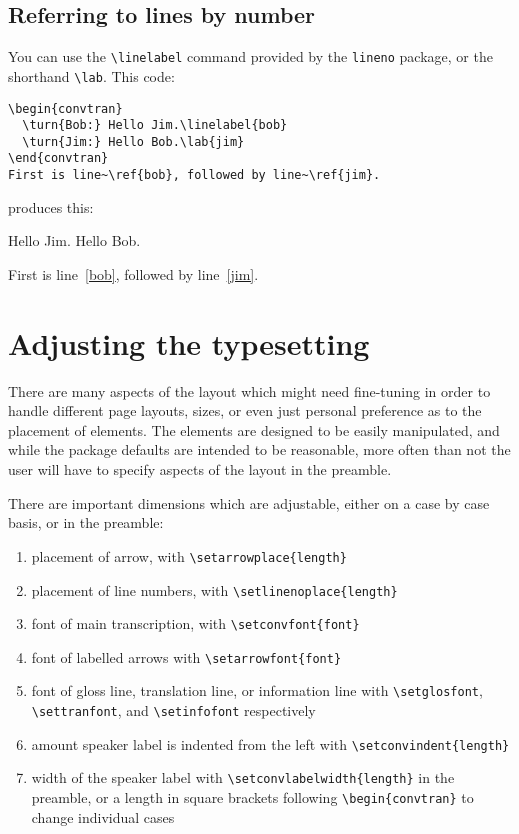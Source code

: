 \documentclass[a4paper]{article}
\begin{document}
\subsection{Referring to lines by number}

You can use the \verb!\linelabel! command provided by the \verb!lineno! package, or the shorthand \verb!\lab!. This code:
\begin{verbatim}
\begin{convtran}
  \turn{Bob:} Hello Jim.\linelabel{bob}
  \turn{Jim:} Hello Bob.\lab{jim}
\end{convtran}
First is line~\ref{bob}, followed by line~\ref{jim}.
\end{verbatim}
produces this:
\begin{convtran}
   Hello Jim.
   Hello Bob.
\end{convtran}
First is line~\ref{bob}, followed by line~\ref{jim}.

\section{Adjusting the typesetting}

There are many aspects of the layout which might need fine-tuning in
order to handle different page layouts, sizes, or even just personal
preference as to the placement of elements.  The elements are designed
to be easily manipulated, and while the package defaults are intended
to be reasonable, more often than not the user will have to specify
aspects of the layout in the preamble.

There are important dimensions which are adjustable, either on a
case by case basis, or in the preamble:
\begin{enumerate}
  \item placement of arrow, with \verb!\setarrowplace{length}!
  \item placement of line numbers, with \verb!\setlinenoplace{length}!
  \item font of main transcription, with \verb!\setconvfont{font}!
  \item font of labelled arrows with \verb!\setarrowfont{font}!
  \item font of gloss line, translation line, or information line with
    \verb!\setglosfont!, \verb!\settranfont!, and \verb!\setinfofont!
    respectively
  \item amount speaker label is indented from the left with
    \verb!\setconvindent{length}!
  \item width of the speaker label with
    \verb!\setconvlabelwidth{length}! in the preamble, or a length in
    square brackets following \verb!\begin{convtran}! to change
    individual cases
\end{enumerate}
  
\end{document}
